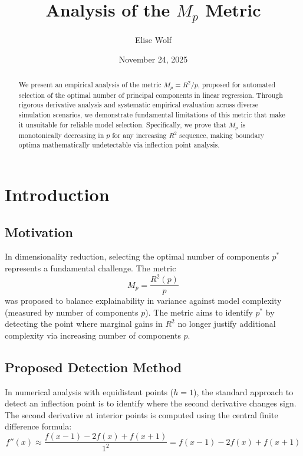 \documentclass[11pt,a4paper]{article}
\title{Analysis of the $M_p$ Metric}
\author{Elise Wolf}
\date{November 24, 2025}
\begin{document}
\maketitle

\begin{abstract}
We present an empirical analysis of the metric $M_p = R^2/p$, proposed for automated selection of the optimal number of principal components in linear regression. Through rigorous derivative analysis and systematic empirical evaluation across diverse simulation scenarios, we demonstrate fundamental limitations of this metric that make it unsuitable for reliable model selection. Specifically, we prove that $M_p$ is monotonically decreasing in $p$ for any increasing $R^2$ sequence, making boundary optima mathematically undetectable via inflection point analysis.
\end{abstract}

\section{Introduction}

\subsection{Motivation}

In dimensionality reduction, selecting the optimal number of components $p^*$ represents a fundamental challenge. The metric
\begin{equation}
M_p = \frac{R^2(p)}{p}
\label{eq:mp_definition}
\end{equation}
was proposed to balance explainability in variance against model complexity (measured by number of components $p$). The metric aims to identify $p^*$ by detecting the point where marginal gains in $R^2$ no longer justify additional complexity via increasing number of components $p$.

\subsection{Proposed Detection Method}

In numerical analysis with equidistant points ($h = 1$), the standard approach to detect an inflection point is to identify where the second derivative changes sign. The second derivative at interior points is computed using the central finite difference formula:
\begin{equation}
f''(x) \approx \frac{f(x-1) - 2f(x) + f(x+1)}{1^2} = f(x-1) - 2f(x) + f(x+1)
\label{eq:standard_second_deriv}
\end{equation}
\end{document}
